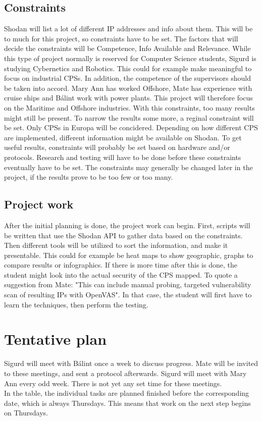 \subsection{Constraints}\label{sec:constraints}
Shodan will list a lot of different IP addresses and info about them. This will be to much for this project, so constraints have to be set. The factors that will decide the constraints will be Competence, Info Available and Relevance. While this type of project normally is reserved for Computer Science students, Sigurd is studying Cybernetics and Robotics. This could for example make meaningful to focus on industrial CPSs. In addition, the competence of the supervisors should be taken into accord. Mary Ann has worked Offshore, Mate has experience with cruise ships and Bálint work with power plants. This project will therefore focus on the Maritime and Offshore industries. With this constraints, too many results might still be present. To narrow the results some more, a reginal constraint will be set. Only CPSs in Europa will be concidered. Depending on how different CPS are implemented, different information might be available on Shodan. To get useful results, constraints will probably be set based on hardware and/or protocols. Research and testing will have to be done before these constraints eventually have to be set. The constraints may generally be changed later in the project, if the results prove to be too few or too many.

\subsection{Project work}\label{sec:work} 
After the initial planning is done, the project work can begin. First, scripts will be written that use the Shodan API to gather data based on the constraints. Then different tools will be utilized to sort the information, and make it presentable. This could for example be heat maps to show geographic, graphs to compare results or infographics. If there is more time after this is done, the student might look into the actual security of the CPS mapped. To quote a suggestion from Mate: "This can include manual probing, targeted vulnerability scan of resulting IPs with OpenVAS". In that case, the student will first have to learn the techniques, then perform the testing.
\newpage

\section{Tentative plan}\label{sec:plan}
 Sigurd will meet with Bálint once a week to discuss progress. Mate will be invited to these meetings, and sent a protocol afterwards. Sigurd will meet with Mary Ann every odd week. There is not yet any set time for these meetings. \\
In the table, the individual tasks are planned finished before the corresponding date, which is always Thursdays. This means that work on the next step begins on Thursdays.
\newline


